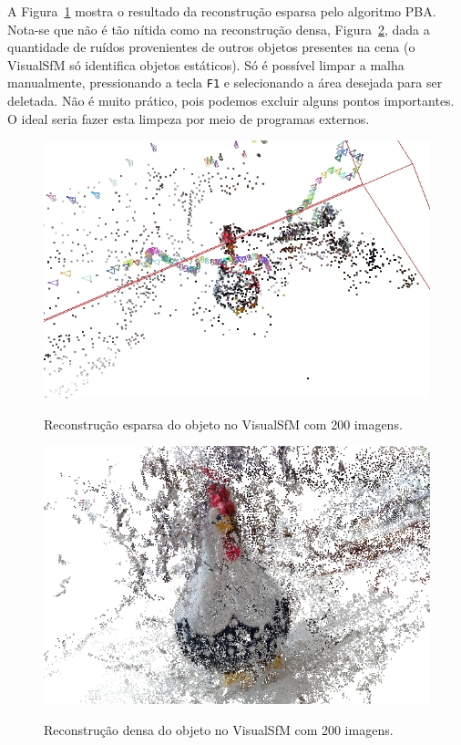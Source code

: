 A Figura~\ref{fig:reconstrucaoEsparsaVisualSFM} mostra o resultado da
reconstrução esparsa pelo algoritmo PBA. Nota-se que não é tão nítida como na reconstrução
densa, Figura~\ref{fig:reconstrucaoDensaVisualSFM}, dada a quantidade de ruídos
provenientes de outros objetos presentes na cena (o VisualSfM só identifica
objetos estáticos). Só é possível limpar a malha manualmente, pressionando a
tecla \texttt{F1} e selecionando a área desejada para ser deletada. Não é muito prático,
pois podemos excluir alguns pontos importantes. O ideal seria fazer esta limpeza
por meio de programas externos.

\begin{figure}[!h]
	\centering
	\caption{%
	Reconstrução esparsa do objeto no VisualSfM com 200 imagens.
	}
		\includegraphics[width=\linewidth]{figs/galinhasparsa.jpg}
	\label{fig:reconstrucaoEsparsaVisualSFM}
\end{figure}

\newpage

\begin{figure}[!h]
	\centering
\caption{%
	Reconstrução densa do objeto no VisualSfM com 200 imagens.
	}	
	\includegraphics[width=\linewidth]{figs/galinhadense.jpg}
	\label{fig:reconstrucaoDensaVisualSFM}
\end{figure}

